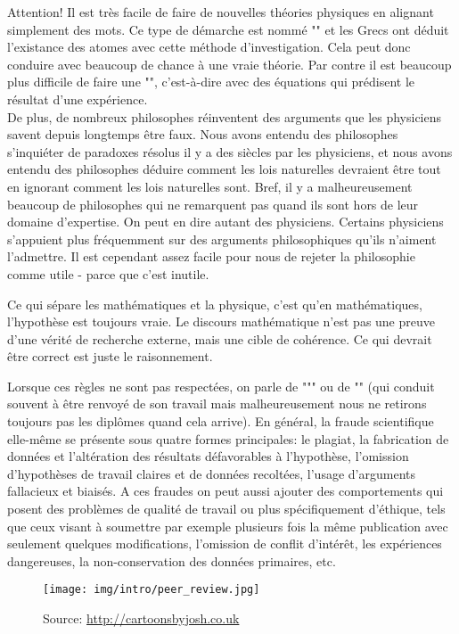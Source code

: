 	
	\begin{tcolorbox}[colback=red!5,borderline={1mm}{2mm}{red!5},arc=0mm,boxrule=0pt]
	\bcbombe Attention! Il est très facile de faire de nouvelles th\'eories physiques en alignant simplement des mots. Ce type de d\'emarche est nomm\'e "" et les Grecs ont d\'eduit l'existance des atomes avec cette m\'ethode d'investigation. Cela peut donc conduire avec beaucoup de chance à une vraie th\'eorie. Par contre il est beaucoup plus difficile de faire une "", c'est-à-dire avec des \'equations qui pr\'edisent le r\'esultat d'une exp\'erience.\\
	
	De plus, de nombreux philosophes réinventent des arguments que les physiciens savent depuis longtemps être faux. Nous avons entendu des philosophes s'inquiéter de paradoxes résolus il y a des siècles par les physiciens, et nous avons entendu des philosophes déduire comment les lois naturelles devraient être tout en ignorant comment les lois naturelles sont. Bref, il y a malheureusement beaucoup de philosophes qui ne remarquent pas quand ils sont hors de leur domaine d'expertise. On peut en dire autant des physiciens. Certains physiciens s'appuient plus fréquemment sur des arguments philosophiques qu'ils n'aiment l'admettre. Il est cependant assez facile pour nous de rejeter la philosophie comme utile -
parce que c'est inutile.
	\end{tcolorbox}

	\begin{tcolorbox}[title=Remarques,colframe=black,arc=10pt]
	Ce qui s\'epare les math\'ematiques et la physique, c'est qu'en math\'ematiques, l'hypothèse est toujours vraie. Le discours math\'ematique n'est pas une preuve d'une v\'erit\'e de recherche externe, mais une cible de coh\'erence. Ce qui devrait être correct est juste le raisonnement.
	\end{tcolorbox}
	
	Lorsque ces règles ne sont pas respect\'ees, on parle de """ ou de "" (qui conduit souvent à être renvoy\'e de son travail mais malheureusement nous ne retirons toujours pas les diplômes quand cela arrive). En g\'en\'eral, la fraude scientifique elle-même se pr\'esente sous quatre formes principales: le plagiat, la fabrication de donn\'ees et l'alt\'eration des r\'esultats d\'efavorables à l'hypothèse, l'omission d'hypothèses de travail claires et de donn\'ees recolt\'ees, l'usage d'arguments fallacieux et biais\'es. A ces fraudes on peut aussi ajouter des comportements qui posent des problèmes de qualit\'e de travail ou plus sp\'ecifiquement d'\'ethique, tels que ceux visant à soumettre par exemple plusieurs fois la même publication avec seulement quelques modifications, l'omission de conflit d'int\'erêt, les exp\'eriences dangereuses, la non-conservation des donn\'ees primaires, etc.
	\begin{figure}[H]
		\centering
		\texttt{[image: img/intro/peer\_review.jpg]}
		\caption[]{Source: \url{http://cartoonsbyjosh.co.uk}}
	\end{figure}	

